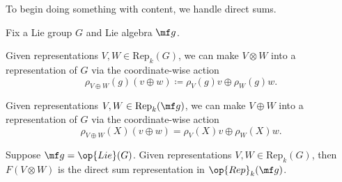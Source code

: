 \documentclass[../notes.tex]{subfiles}
\begin{document}
To begin doing something with content, we handle direct sums.
\begin{lemma}
	Fix a Lie group $G$ and Lie algebra $\mf g$.
	\begin{listalph}
		\item Given representations $V,W\in\mathrm{Rep}_k(G)$, we can make $V\otimes W$ into a representation of $G$ via the coordinate-wise action
		\[\rho_{V\oplus W}(g)(v\oplus w)\coloneqq\rho_V(g)v\oplus\rho_W(g)w.\]
		\item Given representations $V,W\in\mathrm{Rep}_k(\mf g)$, we can make $V\oplus W$ into a representation of $G$ via the coordinate-wise  action
		\[\rho_{V\oplus W}(X)(v\oplus w)=\rho_V(X)v\oplus\rho_W(X)w.\]
		\item Suppose $\mf g=\op{Lie}(G)$. Given representations $V,W\in\mathrm{Rep}_k(G)$, then $F(V\otimes W)$ is the direct sum representation in $\op{Rep}_k(\mf g)$.
	\end{listalph}
\end{lemma}
\end{document}

